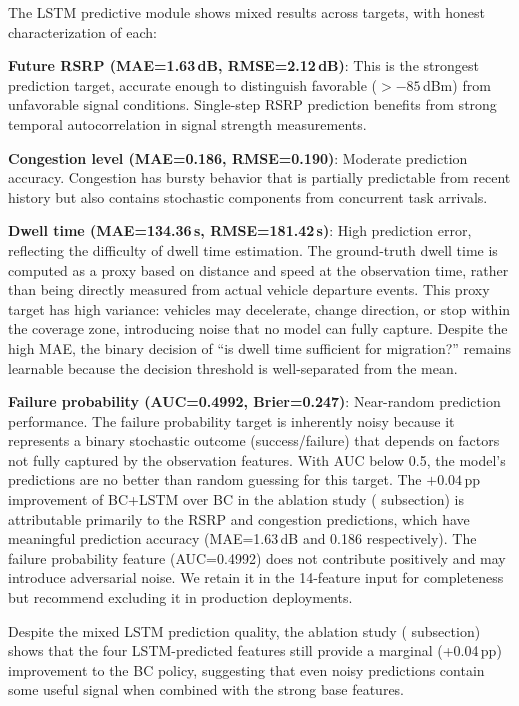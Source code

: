 \documentclass[10pt,letterpaper]{article}
\begin{document}
The LSTM predictive module shows mixed results across targets, with honest characterization of each:

\textbf{Future RSRP (MAE=1.63\,dB, RMSE=2.12\,dB)}: This is the strongest prediction target, accurate enough to distinguish favorable ($>-85$\,dBm) from unfavorable signal conditions. Single-step RSRP prediction benefits from strong temporal autocorrelation in signal strength measurements.

\textbf{Congestion level (MAE=0.186, RMSE=0.190)}: Moderate prediction accuracy. Congestion has bursty behavior that is partially predictable from recent history but also contains stochastic components from concurrent task arrivals.

\textbf{Dwell time (MAE=134.36\,s, RMSE=181.42\,s)}: High prediction error, reflecting the difficulty of dwell time estimation. The ground-truth dwell time is computed as a proxy based on distance and speed at the observation time, rather than being directly measured from actual vehicle departure events. This proxy target has high variance: vehicles may decelerate, change direction, or stop within the coverage zone, introducing noise that no model can fully capture. Despite the high MAE, the binary decision of ``is dwell time sufficient for migration?'' remains learnable because the decision threshold is well-separated from the mean.

\textbf{Failure probability (AUC=0.4992, Brier=0.247)}: Near-random prediction performance. The failure probability target is inherently noisy because it represents a binary stochastic outcome (success/failure) that depends on factors not fully captured by the observation features. With AUC below 0.5, the model's predictions are no better than random guessing for this target. The $+0.04$\,pp improvement of BC+LSTM over BC in the ablation study ( subsection) is attributable primarily to the RSRP and congestion predictions, which have meaningful prediction accuracy (MAE=1.63\,dB and 0.186 respectively). The failure probability feature (AUC=0.4992) does not contribute positively and may introduce adversarial noise. We retain it in the 14-feature input for completeness but recommend excluding it in production deployments.

Despite the mixed LSTM prediction quality, the ablation study ( subsection) shows that the four LSTM-predicted features still provide a marginal (+0.04\,pp) improvement to the BC policy, suggesting that even noisy predictions contain some useful signal when combined with the strong base features.
\end{document}
